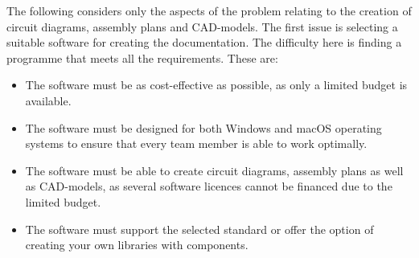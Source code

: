  The following considers only the aspects of the problem relating to the creation of circuit diagrams, assembly plans and CAD-models. The first issue is selecting a suitable software for creating the documentation. The difficulty here is finding a programme that meets all the requirements. These are:
\begin{itemize}
	\item %
	The software must be as cost-effective as possible, as only a limited budget is available.
	\item %
	The software must be designed for both Windows and macOS operating systems to ensure that every team member is able to work optimally.
	\item %
	The software must be able to create circuit diagrams, assembly plans as well as CAD-models, as several software licences cannot be financed due to the limited budget.
	\item %
	The software must support the selected standard or offer the option of creating your own libraries with components.
\end{itemize}   
